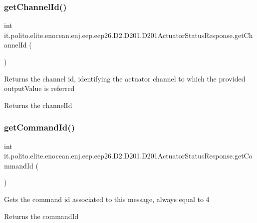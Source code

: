 \subsubsection{\texorpdfstring{get\+Channel\+Id()}{getChannelId()}}
{\footnotesize\ttfamily int it.\+polito.\+elite.\+enocean.\+enj.\+eep.\+eep26.\+D2.\+D201.\+D201\+Actuator\+Status\+Response.\+get\+Channel\+Id (\begin{DoxyParamCaption}{ }\end{DoxyParamCaption})}

Returns the channel id, identifying the actuator channel to which the provided output\+Value is referred

\begin{DoxyReturn}{Returns}
the channel\+Id 
\end{DoxyReturn}
\hypertarget{classit_1_1polito_1_1elite_1_1enocean_1_1enj_1_1eep_1_1eep26_1_1_d2_1_1_d201_1_1_d201_actuator_status_response_a1dd554285f71f0a49b3609774243222d}{}\label{classit_1_1polito_1_1elite_1_1enocean_1_1enj_1_1eep_1_1eep26_1_1_d2_1_1_d201_1_1_d201_actuator_status_response_a1dd554285f71f0a49b3609774243222d} 
\subsubsection{\texorpdfstring{get\+Command\+Id()}{getCommandId()}}
{\footnotesize\ttfamily int it.\+polito.\+elite.\+enocean.\+enj.\+eep.\+eep26.\+D2.\+D201.\+D201\+Actuator\+Status\+Response.\+get\+Command\+Id (\begin{DoxyParamCaption}{ }\end{DoxyParamCaption})}

Gets the command id associated to this message, always equal to 4

\begin{DoxyReturn}{Returns}
the command\+Id 
\end{DoxyReturn}
\hypertarget{classit_1_1polito_1_1elite_1_1enocean_1_1enj_1_1eep_1_1eep26_1_1_d2_1_1_d201_1_1_d201_actuator_status_response_acc9c65f556711f5a61f3f4720aceccbc}{}\label{classit_1_1polito_1_1elite_1_1enocean_1_1enj_1_1eep_1_1eep26_1_1_d2_1_1_d201_1_1_d201_actuator_status_response_acc9c65f556711f5a61f3f4720aceccbc} 
